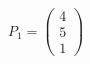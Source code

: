 \documentclass[preview]{standalone}
\begin{document}
\begin{align*}
P_1=\begin{pmatrix}4 \\5 \\1\end{pmatrix}
\end{align*}
\end{document}
